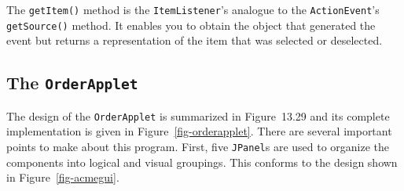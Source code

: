 \noindent The {\tt getItem()} method is the {\tt ItemListener}'s analogue
to the {\tt ActionEvent}'s {\tt getSource()} method. It enables you to obtain
the object that generated the event but returns a representation of
the item that was selected or deselected.

\subsection{The {\tt OrderApplet} }
\noindent The design of the {\tt OrderApplet} is summarized in
Figure~13.29 and its complete implementation is given in
Figure~\ref{fig-orderapplet}. There are several important points to
make about this program. First, five {\tt JPanel}s are used to
organize the components into logical and visual groupings.  This
conforms to the design shown in Figure~\ref{fig-acmegui}.

